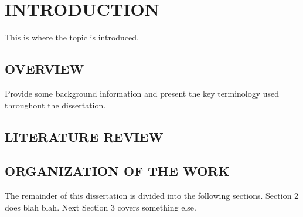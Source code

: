 \documentclass[main.tex]{subfiles}
\begin{document}
\newpage
{}
\setcounter{tocdepth}{2}

\section{INTRODUCTION}

    This is where the topic is introduced.  

\subsection{OVERVIEW}

    Provide some background information and present the key terminology used
    throughout the dissertation.

\subsection{LITERATURE REVIEW}
    

\subsection{ORGANIZATION OF THE WORK}

    The remainder of this dissertation is divided into the following sections.  Section 2
    does blah blah.  Next Section 3 covers something else.
\end{document}
